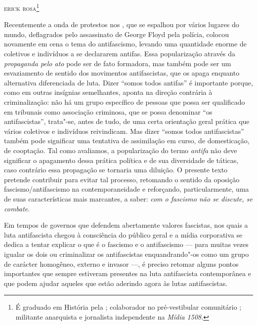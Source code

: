 \hfill{}\textsc{erick rosa}\footnote{É graduado em História pela ; colaborador no
  pré-vestibular comunitário ; militante anarquista e jornalista independente na \emph{Mídia 1508}.}

\bigskip

Recentemente a onda de protestos nos , que se espalhou por vários
lugares do mundo, deflagrados pelo assassinato de George Floyd pela
polícia, colocou novamente em cena o tema do antifascismo, levando uma quantidade enorme de coletivos e indivíduos a se declararem
antifas. Essa popularização através da \emph{propaganda pelo ato}
pode ser de fato formadora, mas também pode ser um esvaziamento de
sentido dos movimentos antifascistas, que os apaga enquanto alternativa
diferenciada de luta. Dizer ``somos todos antifas'' é
importante porque, como em outras insígnias semelhantes, aponta na
direção contrária à criminalização: não há um grupo específico de
pessoas que possa ser qualificado em tribunais como associação
criminosa, que se possa denominar ``os antifascistas'', trata"-se, antes de
tudo, de uma certa orientação geral prática que vários coletivos e
indivíduos reivindicam. Mas dizer ``somos todos antifascistas'' também
pode significar uma tentativa de assimilação em curso, de domesticação,
de cooptação. Tal como avaliamos, a popularização do termo \emph{antifa}
não deve significar o apagamento dessa prática política e de sua
diversidade de táticas, caso contrário essa propagação se
tornaria uma diluição. O presente texto pretende contribuir para evitar
tal processo, retomando o sentido da oposição fascismo/antifascismo na
contemporaneidade e reforçando, particularmente, uma de suas
características mais marcantes, a saber: \emph{com o fascismo não se
discute, se combate}.

Em tempos de governos que defendem abertamente valores fascistas, nos quais a
luta antifascista chegou à consciência do público geral e a mídia
corporativa se dedica a tentar explicar o que é o fascismo e o
antifascismo --- para muitas vezes igualar os dois ou criminalizar os
antifascistas enquandrando"-os como um grupo de carácter homogêneo, externo e invasor ---, é preciso retomar alguns pontos importantes que sempre
estiveram presentes na luta antifascista contemporânea e que podem
ajudar aqueles que estão aderindo agora às lutas antifascistas.

